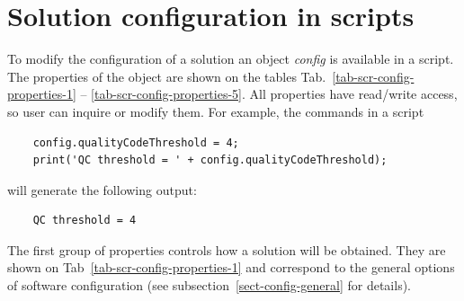 \documentclass [10pt,letterpaper]{report}
\begin{document}
%
%
%
%
\section{Solution configuration in scripts}
\label{section-scripting-config}
To modify the configuration of a solution an object {\sl config} is available
in a script. The properties of the object are shown on the tables
Tab.~\ref{tab-scr-config-properties-1} -- \ref{tab-scr-config-properties-5}.
All properties have read/write access, so user can inquire or modify them.
For example, the commands in a script
{\small\begin{verbatim}
    config.qualityCodeThreshold = 4;
    print('QC threshold = ' + config.qualityCodeThreshold);
\end{verbatim}}
\noindent
will generate the following output:
{\small\begin{verbatim}
    QC threshold = 4
\end{verbatim}}

The first group of properties controls how a solution will be obtained.
They are shown on Tab~\ref{tab-scr-config-properties-1} and correspond to
the general options of software configuration (see subsection~\ref{sect-config-general}
for details).
\end{document}
